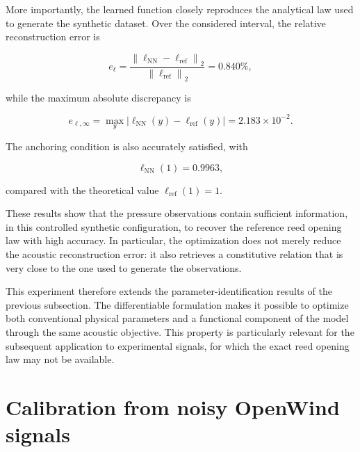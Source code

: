 \documentclass[11pt,a4paper]{report}
\theoremstyle{plain}
\theoremstyle{definition}
\begin{document}
More importantly, the learned function closely reproduces the analytical law
used to generate the synthetic dataset. Over the considered interval, the
relative reconstruction error is

\begin{equation}
    e_{\ell}
    =
    \frac{
        \left\|
        \ell_{\mathrm{NN}}-\ell_{\mathrm{ref}}
        \right\|_2
    }{
        \left\|
        \ell_{\mathrm{ref}}
        \right\|_2
    }
    =
    0.840\%,
    \label{eq:l_relative_error}
\end{equation}

while the maximum absolute discrepancy is

\begin{equation}
    e_{\ell,\infty}
    =
    \max_y
    \left|
        \ell_{\mathrm{NN}}(y)
        -
        \ell_{\mathrm{ref}}(y)
    \right|
    =
    2.183\times10^{-2}.
    \label{eq:l_max_error}
\end{equation}

The anchoring condition is also accurately satisfied, with

\begin{equation}
    \ell_{\mathrm{NN}}(1)=0.9963,
\end{equation}

compared with the theoretical value $\ell_{\mathrm{ref}}(1)=1$.

These results show that the pressure observations contain sufficient
information, in this controlled synthetic configuration, to recover the
reference reed opening law with high accuracy. In particular, the optimization
does not merely reduce the acoustic reconstruction error: it also retrieves a
constitutive relation that is very close to the one used to generate the
observations.

This experiment therefore extends the parameter-identification results of the
previous subsection. The differentiable formulation makes it possible to
optimize both conventional physical parameters and a functional component of
the model through the same acoustic objective. This property is particularly
relevant for the subsequent application to experimental signals, for which the
exact reed opening law may not be available.


\section{Calibration from noisy OpenWind signals}
\label{sec:noisy_openwind_results}
\end{document}
